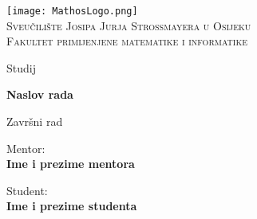 \documentclass{mathos}
\begin{document}
\renewcommand\bibname{Literatura}

\sloppy

\begin{titlepage}
\begin{center}
    \texttt{[image: MathosLogo.png]} \\ \vspace{1mm}
       \textsc{Sveučilište Josipa Jurja Strossmayera u Osijeku} \\
    \vspace{2mm}
    \textsc{Fakultet primijenjene matematike i informatike}
\end{center}

\begin{center}

    \vspace{4mm}
     {Studij} %


\end{center}

\vspace{25mm}
\begin{center}
    {\LARGE{\bf  Naslov rada}}

    \vspace{15mm}
    {\large{\sc Završni rad}}


\end{center}

\vspace{50mm}

\begin{minipage}[t]{0.47\textwidth}
	{Mentor:} \normalsize\vspace{3mm} %
	{\bf\\ \large{Ime i prezime mentora}}


\end{minipage}
\hfill
\begin{minipage}[t]{0.47\textwidth}\raggedleft
	{{Student:}{\normalsize\vspace{3mm} \bf\\ \large{Ime i prezime studenta}}}
\end{minipage}

\vspace*{\fill}
\end{titlepage}
\end{document}
